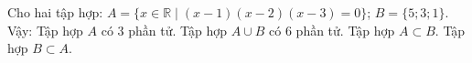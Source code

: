 \begin{ex}
Cho hai tập hợp: $A=\{x\in\mathbb R\mid(x-1)(x-2)(x-3)=0\}$; $B=\{5;3;1\}$. Vậy:
\choiceTF
{\True Tập hợp $A$ có $3$ phần tử.}
{Tập hợp $A\cup B$ có $6$ phần tử.}
{Tập hợp $A\subset B$.}
{Tập hợp $B\subset A$.}
\end{ex}
